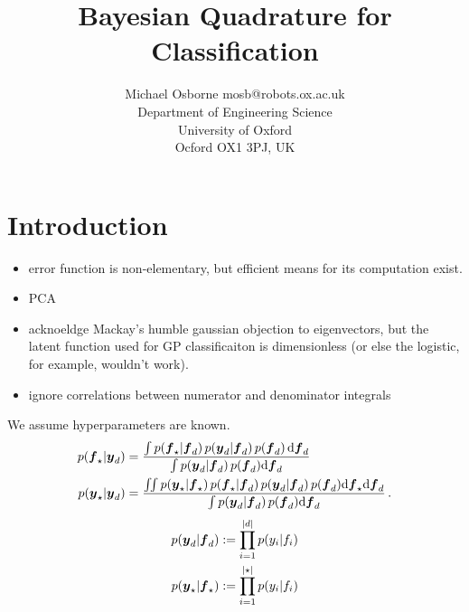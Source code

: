 \documentclass[twoside,11pt]{article}
\begin{document}
\title{Bayesian Quadrature for Classification}

\author{\name Michael Osborne \email mosb@robots.ox.ac.uk \\
       \addr Department of Engineering Science\\
       University of Oxford\\
       Ocford OX1 3PJ, UK}

\editor{-}

\maketitle

\begin{abstract}%
\end{abstract}

\begin{keywords}
\end{keywords}

\section{Introduction}

\begin{itemize}
 \item error function is non-elementary, but efficient means for its computation exist. 
 \item PCA
 \item acknoeldge Mackay's humble gaussian objection to eigenvectors, but the latent function used for GP classificaiton is dimensionless (or else the logistic, for example, wouldn't work).
\item ignore correlations between numerator and denominator integrals
\end{itemize}

We assume hyperparameters are known.
\begin{align*}
\p{\vf\st}{\vy_d}
& =
\frac{\int\p{\vf\st}{\vf_d}\p{\vy_d}{\vf_d}p(\vf_d)\,\ud\vf_d}
{\int \p{\vy_d}{\vf_d}p(\vf_d)\ud\vf_d}
\\
\p{\vy\st}{\vy_d}
& =
\frac{\iint\p{\vy\st}{\vf\st}\p{\vf\st}{\vf_d}\p{\vy_d}{\vf_d}p(\vf_d)\ud\vf\st\ud\vf_d}
{\int\p{\vy_d}{\vf_d}p(\vf_d)\ud\vf_d}\,.
\end{align*}
\begin{align*}
p\!\left(\boldsymbol{y}_d\middle\vert\boldsymbol{f}_d\right) & := \prod_{i=1}^{\left\lvert d\right\rvert}p\!\left(y_i\middle\vert f_i\right) \\
p\!\left(\boldsymbol{y}_\star\middle\vert\boldsymbol{f}_\star\right) & := \prod_{i=1}^{\left\lvert\star\right\rvert}p\!\left(y_i\middle\vert f_i\right)
\end{align*}
\end{document}
